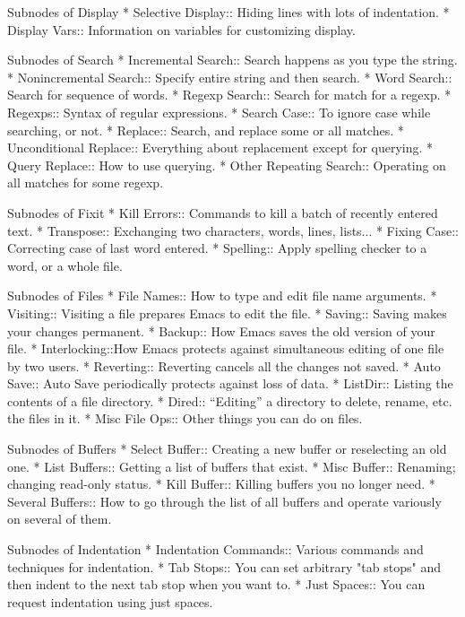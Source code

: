 Subnodes of Display
* Selective Display::      Hiding lines with lots of indentation.
* Display Vars::           Information on variables for customizing display.

Subnodes of Search
* Incremental Search::     Search happens as you type the string.
* Nonincremental Search::  Specify entire string and then search.
* Word Search:: 	   Search for sequence of words.
* Regexp Search::	   Search for match for a regexp.
* Regexps::     	   Syntax of regular expressions.
* Search Case::		   To ignore case while searching, or not.
* Replace::     	   Search, and replace some or all matches.
* Unconditional Replace::  Everything about replacement except for querying.
* Query Replace::          How to use querying.
* Other Repeating Search:: Operating on all matches for some regexp.

Subnodes of Fixit
* Kill Errors:: Commands to kill a batch of recently entered text.
* Transpose::   Exchanging two characters, words, lines, lists...
* Fixing Case:: Correcting case of last word entered.
* Spelling::    Apply spelling checker to a word, or a whole file.

Subnodes of Files
* File Names::  How to type and edit file name arguments.
* Visiting::    Visiting a file prepares Emacs to edit the file.
* Saving::      Saving makes your changes permanent.
* Backup::      How Emacs saves the old version of your file.
* Interlocking::How Emacs protects against simultaneous editing
                 of one file by two users.
* Reverting::   Reverting cancels all the changes not saved.
* Auto Save::   Auto Save periodically protects against loss of data.
* ListDir::     Listing the contents of a file directory.
* Dired::       ``Editing'' a directory to delete, rename, etc.
                 the files in it.
* Misc File Ops:: Other things you can do on files.

Subnodes of Buffers
* Select Buffer::   Creating a new buffer or reselecting an old one.
* List Buffers::    Getting a list of buffers that exist.
* Misc Buffer::     Renaming; changing read-only status.
* Kill Buffer::     Killing buffers you no longer need.
* Several Buffers:: How to go through the list of all buffers
                     and operate variously on several of them.

Subnodes of Indentation
* Indentation Commands:: Various commands and techniques for indentation.
* Tab Stops::   You can set arbitrary "tab stops" and then
                 indent to the next tab stop when you want to.
* Just Spaces:: You can request indentation using just spaces.

